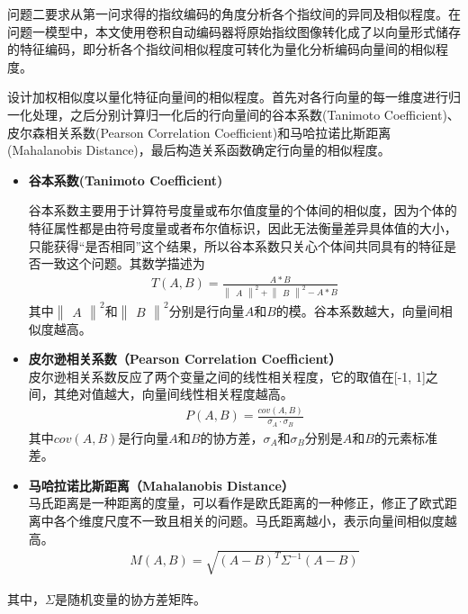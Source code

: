 \documentclass{whutmod}
\begin{document}
问题二要求从第一问求得的指纹编码的角度分析各个指纹间的异同及相似程度。在问题一模型中，本文使用卷积自动编码器将原始指纹图像转化成了以向量形式储存的特征编码，即分析各个指纹间相似程度可转化为量化分析编码向量间的相似程度。

设计加权相似度以量化特征向量间的相似程度。首先对各行向量的每一维度进行归一化处理，之后分别计算归一化后的行向量间的谷本系数(Tanimoto Coefficient)、皮尔森相关系数(Pearson Correlation Coefficient)和马哈拉诺比斯距离(Mahalanobis Distance)，最后构造关系函数确定行向量的相似程度。
			
			
			\begin{itemize}
				\item \textbf{谷本系数(Tanimoto Coefficient)}
				
				谷本系数主要用于计算符号度量或布尔值度量的个体间的相似度，因为个体的特征属性都是由符号度量或者布尔值标识，因此无法衡量差异具体值的大小，只能获得“是否相同”这个结果，所以谷本系数只关心个体间共同具有的特征是否一致这个问题。其数学描述为
				\begin{gather}
				T(A,B)=\frac{A\ast B}{\begin{Vmatrix}
						A
					\end{Vmatrix}^2+\begin{Vmatrix}
						B
					\end{Vmatrix}^2-A\ast B}
				\end{gather}
				其中$\begin{Vmatrix}
				A
				\end{Vmatrix}^2$和$\begin{Vmatrix}
				B
				\end{Vmatrix}^2$分别是行向量$A$和$B$的模。谷本系数越大，向量间相似度越高。
				\item \textbf{皮尔逊相关系数（Pearson Correlation Coefficient）}\\
				皮尔逊相关系数反应了两个变量之间的线性相关程度，它的取值在[-1, 1]之间，其绝对值越大，向量间线性相关程度越高。
				\begin{gather}
					P(A,B)=\frac{cov(A,B)}{\sigma_A\cdot \sigma_B}
				\end{gather}
				其中$cov(A,B)$是行向量$A$和$B$的协方差，$\sigma_A$和$\sigma_B$分别是$A$和$B$的元素标准差。
				\item \textbf{马哈拉诺比斯距离（Mahalanobis Distance）}\\
				马氏距离是一种距离的度量，可以看作是欧氏距离的一种修正，修正了欧式距离中各个维度尺度不一致且相关的问题。马氏距离越小，表示向量间相似度越高。
				\begin{gather}
				M(A,B)=\sqrt{(A-B)^T\Sigma^{-1}(A-B)}
				\end{gather}
			\end{itemize}
			其中，$\Sigma$是随机变量的协方差矩阵。
			
\end{document}
